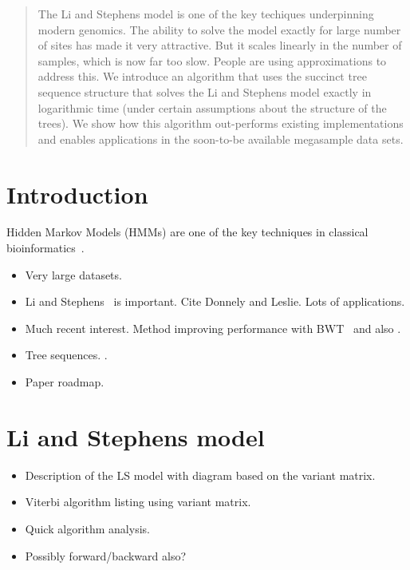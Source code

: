 \documentclass{article}
\begin{document}
\begin{abstract}
The Li and Stephens model is one of the key techiques underpinning modern
genomics. The ability to solve the model exactly for large number of
sites has made it very attractive. But it scales linearly in the number
of samples, which is now far too slow. People are using approximations
to address this. We introduce an algorithm that uses the succinct
tree sequence structure that solves the Li and Stephens model exactly
in logarithmic time (under certain assumptions about the structure
of the trees). We show how this algorithm out-performs existing implementations
and enables applications in the soon-to-be available megasample data sets.

\end{abstract}


\section{Introduction}
Hidden Markov Models (HMMs) are one of the key techniques in classical
bioinformatics~\citep{durbin1998biological}.

\begin{itemize}
\item Very large datasets.
\item Li and Stephens~\citep{li2003modeling,donnelly2010coalescent} is important. Cite Donnely and
Leslie. Lots of applications.
\item Much recent interest. Method improving performance with BWT~\citep{lunter2018haplotype}
and also \citep{rosen2018average}.
\item Tree sequences.
\citep{kelleher2016efficient,kelleher2018efficient,kelleher2018inferring,haller2018tree}.
\item Paper roadmap.
\end{itemize}

\section{Li and Stephens model}

\begin{itemize}
\item Description of the LS model with diagram based on the variant matrix.
\item Viterbi algorithm listing using variant matrix.
\item Quick algorithm analysis.
\item Possibly forward/backward also?
\end{itemize}
\end{document}
